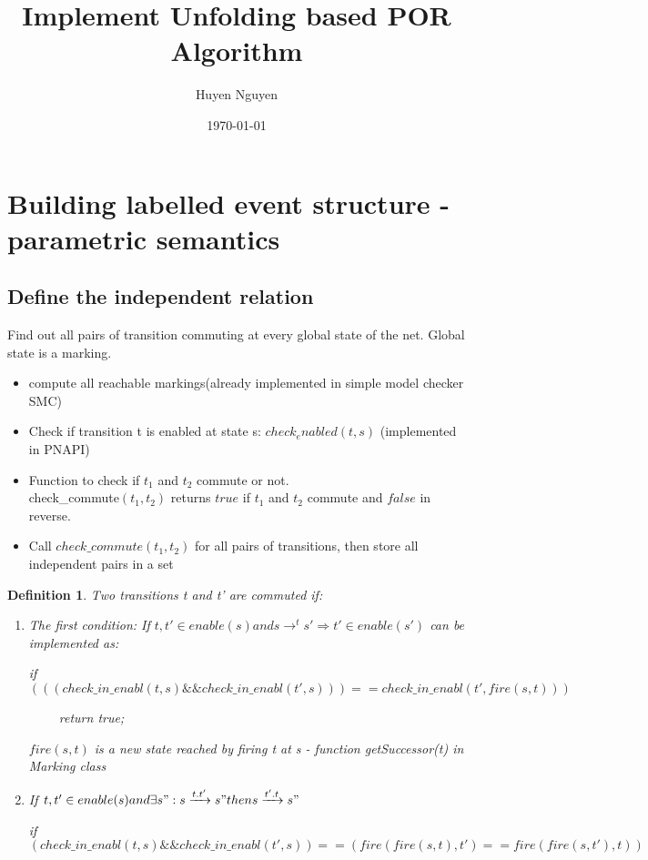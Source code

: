 \documentclass[11pt]{article}
\newtheorem{definition}{Definition}
\begin{document}
\title{Implement Unfolding based POR Algorithm}
\author{Huyen Nguyen}
\date{\today}
\maketitle

\section{Building labelled event structure - parametric semantics}
\subsection{Define the independent relation}
	Find out all pairs of transition commuting at every global state of the net.
	Global state is a marking. 
	\begin{itemize}
	\item compute all reachable markings(already implemented in simple model checker SMC)
	\item Check if transition t is enabled at state s: $check_enabled(t,s)$ (implemented in PNAPI)
	\item Function to check if $t_1$ and $t_2$ commute or not.\\
			check\_commute$(t_1,t_2)$ returns $true$ if $t_1$ and $t_2$ commute and $false$ in reverse.
	\item Call $check\_commute(t_1,t_2)$ for all pairs of transitions, then store all independent pairs in a set
	\end{itemize}

\begin{definition}
	Two transitions t and t' are commuted if:
	\begin{enumerate}
		\item The first condition: If $t, t'\in enable(s) and s\rightarrow ^t s' \Longrightarrow t'\in enable(s')$ 				can be implemented as:
		
		if  $\left( \left((check\_in\_enabl(t,s)\&\& check\_in\_enabl(t',s))\right)
		==check\_in\_enabl(t',fire(s,t)) \right)$
		
		$\qquad$ return true;
		
		$ fire(s,t)$ is a new state reached by firing t at s - function getSuccessor(t) in Marking class
				
		\item If $t, t' \in enable(s) and \exists s": s\xrightarrow{t.t'} s" then s\xrightarrow{t'.t} s"$ 
		
		if $\left(check\_in\_enabl(t,s)\&\& check\_in\_enabl(t',s)\right) == 													\left(fire(fire(s,t),t')==fire(fire(s,t'),t)\right)$
		
	\end{enumerate}
\end{definition}
\end{document}
